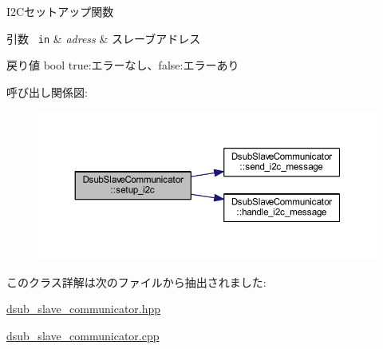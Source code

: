 I2\+Cセットアップ関数 


\begin{DoxyParams}[1]{引数}
\mbox{\texttt{ in}}  & {\em adress} & スレーブアドレス \\
\hline
\end{DoxyParams}
\begin{DoxyReturn}{戻り値}
bool true\+:エラーなし、false\+:エラーあり 
\end{DoxyReturn}
呼び出し関係図\+:\nopagebreak
\begin{figure}[H]
\begin{center}
\leavevmode
\includegraphics[width=350pt]{class_dsub_slave_communicator_a38614c9732f810200a8429dd4bac88aa_cgraph}
\end{center}
\end{figure}


このクラス詳解は次のファイルから抽出されました\+:\begin{DoxyCompactItemize}
\item 
\mbox{\hyperlink{dsub__slave__communicator_8hpp}{dsub\+\_\+slave\+\_\+communicator.\+hpp}}\item 
\mbox{\hyperlink{dsub__slave__communicator_8cpp}{dsub\+\_\+slave\+\_\+communicator.\+cpp}}\end{DoxyCompactItemize}
